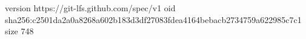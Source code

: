 version https://git-lfs.github.com/spec/v1
oid sha256:c2501da2a0a8268a602b183d3df27083fdea4164bebacb2734759a622985c7c1
size 748
